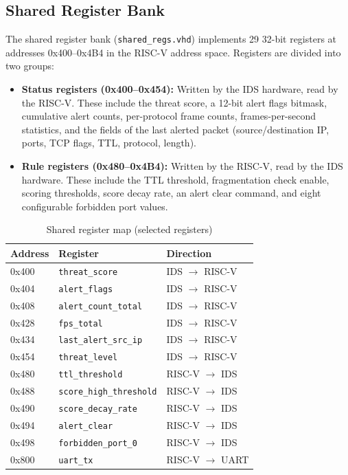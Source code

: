 \documentclass[12pt, a4paper]{report}
\begin{document}
\subsection{Shared Register Bank}

The shared register bank (\texttt{shared\_regs.vhd}) implements 29 32-bit registers at addresses 0x400--0x4B4 in the RISC-V address space. Registers are divided into two groups:

\begin{itemize}
    \item \textbf{Status registers (0x400--0x454):} Written by the IDS hardware, read by the RISC-V. These include the threat score, a 12-bit alert flags bitmask, cumulative alert counts, per-protocol frame counts, frames-per-second statistics, and the fields of the last alerted packet (source/destination IP, ports, TCP flags, TTL, protocol, length).
    \item \textbf{Rule registers (0x480--0x4B4):} Written by the RISC-V, read by the IDS hardware. These include the TTL threshold, fragmentation check enable, scoring thresholds, score decay rate, an alert clear command, and eight configurable forbidden port values.
\end{itemize}

\begin{table}[H]
\centering
\caption{Shared register map (selected registers)}
\label{tab:regmap}
\begin{tabular}{lll}
\toprule
\textbf{Address} & \textbf{Register} & \textbf{Direction} \\
\midrule
0x400 & \texttt{threat\_score}        & IDS $\rightarrow$ RISC-V \\
0x404 & \texttt{alert\_flags}         & IDS $\rightarrow$ RISC-V \\
0x408 & \texttt{alert\_count\_total}  & IDS $\rightarrow$ RISC-V \\
0x428 & \texttt{fps\_total}           & IDS $\rightarrow$ RISC-V \\
0x434 & \texttt{last\_alert\_src\_ip} & IDS $\rightarrow$ RISC-V \\
0x454 & \texttt{threat\_level}        & IDS $\rightarrow$ RISC-V \\
0x480 & \texttt{ttl\_threshold}       & RISC-V $\rightarrow$ IDS \\
0x488 & \texttt{score\_high\_threshold} & RISC-V $\rightarrow$ IDS \\
0x490 & \texttt{score\_decay\_rate}   & RISC-V $\rightarrow$ IDS \\
0x494 & \texttt{alert\_clear}         & RISC-V $\rightarrow$ IDS \\
0x498 & \texttt{forbidden\_port\_0}   & RISC-V $\rightarrow$ IDS \\
0x800 & \texttt{uart\_tx}             & RISC-V $\rightarrow$ UART \\
\bottomrule
\end{tabular}
\end{table}
\end{document}
